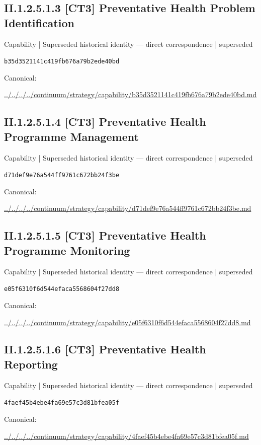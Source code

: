 \documentclass[10pt,a4paper]{article}
\begin{document}
\subsection*{II.1.2.5.1.3 [CT3] Preventative Health Problem Identification}
{\small Capability | Superseded historical identity — direct correspondence | superseded}\par
\texttt{b35d3521141c419fb676a79b2ede40bd}\par
Canonical: \par
{\footnotesize\url{../../../../continuum/strategy/capability/b35d3521141c419fb676a79b2ede40bd.md}}\par
\subsection*{II.1.2.5.1.4 [CT3] Preventative Health Programme Management}
{\small Capability | Superseded historical identity — direct correspondence | superseded}\par
\texttt{d71def9e76a544ff9761c672bb24f3be}\par
Canonical: \par
{\footnotesize\url{../../../../continuum/strategy/capability/d71def9e76a544ff9761c672bb24f3be.md}}\par
\subsection*{II.1.2.5.1.5 [CT3] Preventative Health Programme Monitoring}
{\small Capability | Superseded historical identity — direct correspondence | superseded}\par
\texttt{e05f6310f6d544efaca5568604f27dd8}\par
Canonical: \par
{\footnotesize\url{../../../../continuum/strategy/capability/e05f6310f6d544efaca5568604f27dd8.md}}\par
\subsection*{II.1.2.5.1.6 [CT3] Preventative Health Reporting}
{\small Capability | Superseded historical identity — direct correspondence | superseded}\par
\texttt{4faef45b4ebe4fa69e57c3d81bfea05f}\par
Canonical: \par
{\footnotesize\url{../../../../continuum/strategy/capability/4faef45b4ebe4fa69e57c3d81bfea05f.md}}\par
\end{document}
